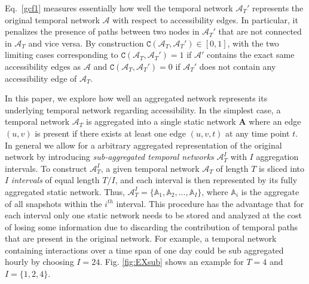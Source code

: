 \documentclass[%
 reprint,
 amsmath,amssymb,
 aps,
]{revtex4-2}
\begin{document}
Eq.~\eqref{gcf1} measures essentially how well the temporal network $\mathcal{A}_T'$ represents the original temporal network $\mathcal{A}$ with respect to accessibility edges. 
In particular, it penalizes the presence of paths between two nodes in $\mathcal{A}_T'$ that are not connected in $\mathcal{A}_T$  and vice versa. 
By construction $\mathtt{C}(\mathcal{A}_T,\mathcal{A}_T')\in [0,1]$, with the two limiting cases corresponding to $\mathtt{C}(\mathcal{A}_T,\mathcal{A}_T')=1$ if $\mathcal{A'}$ contains the exact same accessibility edges as $\mathcal{A}$ and $\mathtt{C}(\mathcal{A}_T,\mathcal{A}_T')=0$ if $\mathcal{A}_T'$ does not contain any accessibility edge of $\mathcal{A}_T$.


In this paper, we explore how well an aggregated network represents its underlying temporal network regarding accessibility.
In the simplest case, a temporal network $\mathcal{A}_T$ is aggregated into a single static network $\mathbf{A}$ where an edge $(u,v)$ is present if there exists at least one edge $(u,v,t)$ at any time point $t$. In general we allow for a arbitrary aggregated representation of the original network by introducing \textit{sub-aggregated  temporal networks} $\mathcal{A}^I_T$ with $I$ aggregation intervals. To construct %
$\mathcal{A}^I_T$, a given temporal network $\mathcal{A}_T$ of length $T$ is sliced into $I$ \textit{intervals} of equal length $T/I$, and each interval is then represented by its fully aggregated static network. Thus, $\mathcal{A}^I_T= \{\mathbb{A}_1,\mathbb{A}_2,...,\mathbb{A}_I\}$, where $\mathbb{A}_i$ %
is the aggregate of all snapshots within the $i^{th}$ interval. 
This procedure has the advantage that for each interval only one static network needs to be stored and analyzed at the cost of losing some information due to discarding the contribution of temporal paths that are present in the original network.
For example, a temporal network containing interactions over a time span of one day could be sub aggregated hourly by choosing $I=24$. Fig. \ref{fig:EXsub} shows an example for $T=4$ and $I=\{1,2,4\}$.
\end{document}
